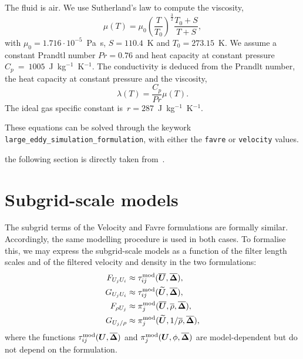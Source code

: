 The fluid is air. We use Sutherland's law \cite{sutherland1893lii} to compute the viscosity,
\begin{equation}
\mu(T) = \mu_0 \left(\frac{T}{T_0}\right)^{\frac{3}{2}} \frac{T_0 + S}{T + S},
\end{equation}
with $\mu_0 = 1.716\cdot 10^{-5}$~Pa~s, $S=110.4$~K and $T_0 = 273.15$~K.
We assume a constant Prandtl number $Pr = 0.76$ and heat capacity at
constant pressure $C_p~=~1005$~J~kg$^{-1}$~K$^{-1}$.
The conductivity is deduced from the Prandlt number, the heat capacity at
constant pressure and the viscosity,
\begin{equation}
\lambda(T) = \frac{C_p}{Pr} \mu(T).
\end{equation}
The ideal gas specific constant is~$r=287$~J~kg$^{-1}$~K$^{-1}$.


These equations can be solved through the keywork \texttt{large\_eddy\_simulation\_formulation}, with either the \texttt{favre} or \texttt{velocity} values.

the following section is directly taken from~\cite{dupuy2016,dupuy2017sft,dupuy2018study}.

\section{Subgrid-scale models}

The subgrid terms of the Velocity and Favre formulations are formally
similar. Accordingly, the same modelling procedure is used in both cases.
To formalise this, we may express the subgrid-scale models as a function
of the filter length scales and of the filtered velocity and density
in the two formulations:
\begin{align}
F_{U_j U_i} \approx{}& \tau_{ij}^{\mathrm{mod}}(\boldsymbol{\overline{U}}, \boldsymbol{\overline{\Delta}}), \\
G_{U_j U_i} \approx{}& \tau_{ij}^{\mathrm{mod}}(\boldsymbol{\widetilde{U}}, \boldsymbol{\overline{\Delta}}), \\
F_{\rho U_j} \approx{}& \pi_{j}^{\mathrm{mod}}(\boldsymbol{\overline{U}}, \overline{\rho}, \boldsymbol{\overline{\Delta}}), \\
G_{U_j/\rho} \approx{}& \pi_{j}^{\mathrm{mod}}(\boldsymbol{\widetilde{U}}, 1/\overline{\rho}, \boldsymbol{\overline{\Delta}}),
\end{align}%
where the functions $\tau_{ij}^{\mathrm{mod}}(\boldsymbol{U},\boldsymbol{\overline{\Delta}})$ and
$\pi_j^{\mathrm{mod}}(\boldsymbol{U},\phi,\boldsymbol{\overline{\Delta}})$ are model-dependent but do not depend on the formulation.

